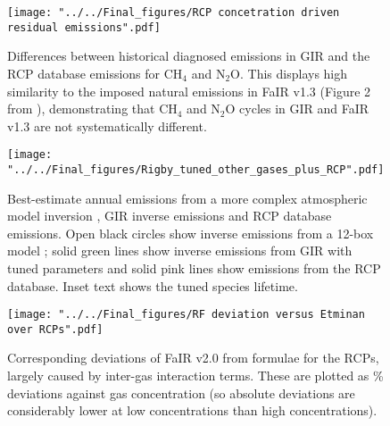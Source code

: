 \documentclass[gmd, manuscript]{copernicus}
\providecommand{\DIFadd}[1]{{\protect\color{blue}\uwave{#1}}} %
\providecommand{\DIFaddFL}[1]{\DIFadd{#1}} %
\providecommand{\DIFaddbeginFL}{} %
\providecommand{\DIFaddendFL}{} %
\begin{document}
\clearpage
\begin{figure}[t]
    \texttt{[image: "../../Final\_figures/RCP concetration driven residual emissions".pdf]}
    \caption{Differences between historical diagnosed emissions in GIR and the RCP database emissions for CH$_4$ and N$_2$O. This displays high similarity to the imposed natural emissions in FaIR v1.3 (Figure 2 from \cite{Smith2017}), demonstrating that CH$_4$ and N$_2$O cycles in GIR and FaIR v1.3 are not systematically different.}
\end{figure}
\clearpage
\begin{figure}[t]
    \texttt{[image: "../../Final\_figures/Rigby\_tuned\_other\_gases\_plus\_RCP".pdf]}
    \caption{Best-estimate annual emissions \DIFaddbeginFL \DIFaddFL{(Tg) }\DIFaddendFL from a more complex atmospheric model inversion \cite{Rigby2014}, GIR inverse emissions and RCP database emissions. Open black circles show inverse emissions from a 12-box model \cite{Cunnold1994}; solid green lines show inverse emissions from GIR with tuned parameters and solid pink lines show emissions from the RCP database. Inset text shows the tuned species lifetime.}
\end{figure}
\clearpage
\begin{figure}[t]
    \texttt{[image: "../../Final\_figures/RF deviation versus Etminan over RCPs".pdf]}
    \caption{Corresponding deviations of FaIR v2.0 from \cite{Etminan2016} formulae for the RCPs, largely caused by inter-gas interaction terms. These are plotted as \% deviations against gas concentration (so absolute deviations are considerably lower at low concentrations than high concentrations).}
\end{figure}
\clearpage
\end{document}

